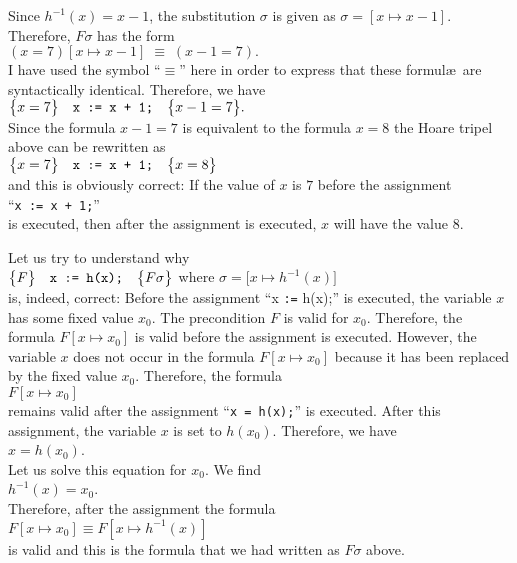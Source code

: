 Since $h^{-1}(x) = x - 1$, the substitution $\sigma$ is given as
$\sigma = [ x \mapsto x - 1 ]$.  Therefore, $F\sigma$ has the form
\\[0.2cm]
\hspace*{1.3cm}
$ (x = 7)[x \mapsto x - 1] \;\equiv\; (x - 1 = 7). $
\\[0.2cm]
I have used the symbol ``$\equiv$'' here in order to express that these formul\ae\ are
syntactically identical.  
Therefore, we have
\\[0.2cm]
\hspace*{1.3cm}
$ \bigl\{x = 7\bigr\}\quad\texttt{x := x + 1;}\quad\bigl\{x - 1 = 7\bigr\}. $
\\[0.2cm]
Since the formula $x - 1 = 7$ is equivalent to the formula $x = 8$ the Hoare tripel above can be
rewritten as  
\\[0.2cm]
\hspace*{1.3cm}
$ \bigl\{x = 7\bigr\}\quad\texttt{x := x + 1;}\quad\bigl\{x = 8\bigr\} $
\\[0.2cm]
and this is obviously correct:  If the value of $x$ is $7$ before the assignment
\\[0.2cm]
\hspace*{1.3cm}
``\texttt{x := x + 1;}'' 
\\[0.2cm]
is executed, then after the assignment is executed, $x$ will have the value $8$.

Let us try to understand why
\\[0.2cm]
\hspace*{1.3cm}
$\bigl\{F\bigr\}\quad\texttt{x := h(x);}\quad\bigl\{F\sigma\bigr\}$ \quad where \quad 
$\sigma = \bigl[x \mapsto h^{-1}(x)\bigr] $
\\[0.2cm]
is, indeed, correct:   Before the assignment ``x \texttt{:=} h(x);'' is executed,
the variable $x$ has some fixed value $x_0$.  The precondition $F$ is valid for $x_0$.  Therefore,
the formula $F[x \mapsto x_0]$ is valid before the assignment is executed.  However,
the variable $x$ does not occur in the formula $F[x \mapsto x_0]$ because it has been replaced by
the fixed value $x_0$.  Therefore, the formula
\\[0.2cm]
\hspace*{1.3cm}
$ F[x \mapsto x_0] $
\\[0.2cm]
remains valid after the assignment  ``\texttt{x = h(x);}'' is executed.  After this assignment,
the variable $x$ is set to $h(x_0)$. Therefore, we have
\\[0.2cm]
\hspace*{1.3cm}
$x = h(x_0)$.
\\[0.2cm]  
Let us solve this equation for $x_0$.  We find
\\[0.2cm]
\hspace*{1.3cm}
$h^{-1}(x) = x_0$.
\\[0.2cm]
Therefore, after the assignment the formula 
\\[0.2cm]
\hspace*{1.3cm}
$ F[x \mapsto x_0] \equiv  F[x \mapsto h^{-1}(x)]$ 
\\[0.2cm]
is valid and  this is the formula that we had written as $F\sigma$ above.

